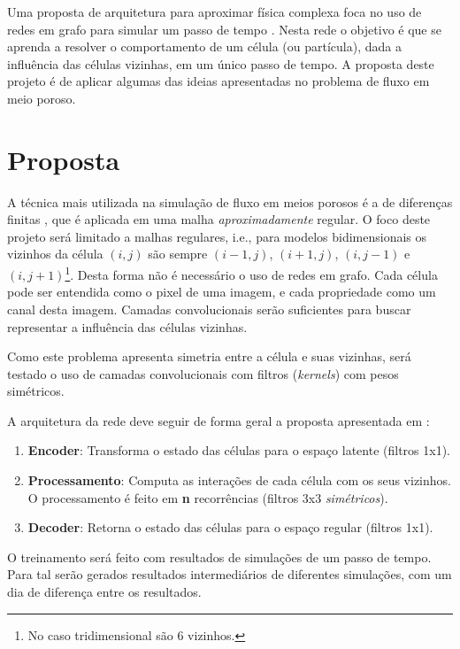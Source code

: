 \documentclass[final,5p]{elsarticle}
\numberwithin{equation}{section}
\begin{document}
    Uma proposta de arquitetura para aproximar física complexa foca no uso de redes em grafo para simular um passo de tempo \cite{sanchez2020learning}. Nesta rede o objetivo é que se aprenda a resolver o comportamento de um célula (ou partícula), dada a influência das células vizinhas, em um único passo de tempo. A proposta deste projeto é de aplicar algumas das ideias apresentadas no problema de fluxo em meio poroso.

\section{Proposta}

    A técnica mais utilizada na simulação de fluxo em meios porosos é a de diferenças finitas \cite{computer2022cmg,schlumberger2009technical}, que é aplicada em uma malha \emph{aproximadamente} regular. O foco deste projeto será limitado a malhas regulares, i.e., para modelos bidimensionais os vizinhos da célula $(i,j)$ são sempre $(i-1,j)$, $(i+1,j)$, $(i,j-1)$ e $(i,j+1)$\footnote{No caso tridimensional são 6 vizinhos.}. Desta forma não é necessário o uso de redes em grafo. Cada célula pode ser entendida como o pixel de uma imagem, e cada propriedade como um canal desta imagem. Camadas convolucionais serão suficientes para buscar representar a influência das células vizinhas.

    Como este problema apresenta simetria entre a célula e suas vizinhas, será testado o uso de camadas convolucionais com filtros (\emph{kernels}) com pesos simétricos.

    A arquitetura da rede deve seguir de forma geral a proposta apresentada em \cite{sanchez2020learning}:

    \begin{enumerate}
        \item \textbf{Encoder}: Transforma o estado das células para o espaço latente (filtros 1x1).
        \item \textbf{Processamento}: Computa as interações de cada célula com os seus vizinhos. O processamento é feito em \textbf{n} recorrências (filtros 3x3 \emph{simétricos}).
        \item \textbf{Decoder}: Retorna o estado das células para o espaço regular (filtros 1x1).
    \end{enumerate}

    O treinamento será feito com resultados de simulações de um passo de tempo. Para tal serão gerados resultados intermediários de diferentes simulações, com um dia de diferença entre os resultados.
\end{document}
